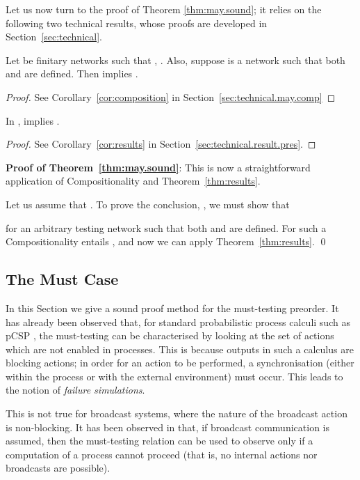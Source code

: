 \documentclass{LMCS}
\begin{document}
Let us now turn to the proof of Theorem \ref{thm:may.sound};
it relies on the following two technical results, whose proofs are developed
in Section~\ref{sec:technical}. 
\begin{thm}[Compositionality]\label{thm:composition}
Let  be finitary networks such that , . 
Also, suppose  is a network such that both 
 and  are defined. 
Then  implies  
.
\end{thm}
\begin{proof}
  See Corollary~\ref{cor:composition} in Section~\ref{sec:technical.may.comp}
\end{proof}

\begin{thm}\label{thm:results}
  In ,  implies
  .
\end{thm}
\begin{proof}
  See  Corollary~\ref{cor:results} in Section~\ref{sec:technical.result.pres}. 
\end{proof}

\textbf{Proof of Theorem~\ref{thm:may.sound}}: 
This is now a straightforward application of  Compositionality and Theorem~\ref{thm:results}. 

Let us assume that .
To prove the conclusion,  , we must show that 

for an arbitrary testing network  
such that both   and  are defined. 
For such a  Compositionality entails  
, and now we can apply 
Theorem~\ref{thm:results}. \qed

\subsection{The Must Case}
\label{sec:must.sound}
In this Section we give a sound proof method for the must-testing 
preorder. It has already been observed that, for standard 
probabilistic process calculi such as pCSP \cite{DGHM09full}, 
the must-testing can be characterised by looking at the 
set of actions which are not enabled in processes. 
This is because outputs in such a calculus are blocking 
actions; in order for an action to be performed, a synchronisation 
(either within the process or with the external environment) 
must occur. This leads to the notion of \emph{failure simulations}.

This is not true for broadcast systems, where the nature of 
the broadcast action is non-blocking. It has been observed 
in \cite{Ene02} that, if broadcast communication is assumed, 
then the must-testing relation can be used to observe only if  
a computation of a process cannot proceed (that is, no 
internal actions nor broadcasts are possible). 
\end{document}
